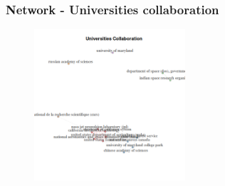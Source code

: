 \documentclass[aspectratio=169]{beamer}
\begin{document}
\begin{frame}
	\frametitle{Network - Universities collaboration}
	\begin{figure}
		\centering
		\includegraphics[width=0.5\textwidth]
		{figures/bnet_universities_collaboration.png}
	\end{figure}
\end{frame}
\end{document}

